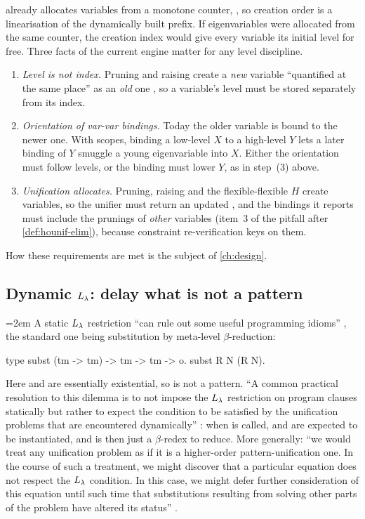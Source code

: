 \begin{kanren}
\micro{} already allocates variables from a monotone counter, , so creation order is a
linearisation of the dynamically built prefix. If eigenvariables were allocated from the same counter, the
creation index would give every variable its initial level for free. Three facts of the current engine matter for
any level discipline.
\begin{enumerate}[nosep]
  \item \emph{Level is not index.} Pruning and raising create a \emph{new} variable \enquote{quantified at the same
    place} as an \emph{old} one , so a variable's level must be stored separately from its index.
  \item \emph{Orientation of var-var bindings.} Today the older variable is bound to the newer one. With scopes,
    binding a low-level $X$ to a high-level $Y$ lets a later binding of $Y$ smuggle a young eigenvariable into $X$.
    Either the orientation must follow levels, or the binding must lower $Y$, as in step~(3) above.
  \item \emph{Unification allocates.} Pruning, raising and the flexible-flexible $H$ create variables, so the
    unifier must return an updated , and the bindings it reports must include the prunings of
    \emph{other} variables (item~3 of the pitfall after \cref{def:hounif-elim}), because constraint re-verification keys on them.
\end{enumerate}
How these requirements are met is the subject of \cref{ch:design}.
\end{kanren}

\subsection{Dynamic \texorpdfstring{$L_\lambda$}{Lλ}: delay what is not a pattern}\label{sec:hounif-dynamic}

{\emergencystretch=2em
A static $L_\lambda$ restriction \enquote{can rule out some useful programming idioms} , the standard one
being substitution by meta-level $\beta$-reduction:\par}
\begin{lprolog}
type   subst   (tm -> tm) -> tm -> tm -> o.
subst R N (R N).
\end{lprolog}
Here  and  are essentially existential, so  is not a pattern. \enquote{A common practical
resolution to this dilemma is to not impose the $L_\lambda$ restriction on program clauses statically but rather to
expect the condition to be satisfied by the unification problems that are encountered dynamically} :
when  is called,  and  are expected to be instantiated, and  is then just a $\beta$-redex
to reduce. More generally: \enquote{we would treat any unification problem as if it is a higher-order
pattern-unification one. In the course of such a treatment, we might discover that a particular equation does not
respect the $L_\lambda$ condition. In this case, we might defer further consideration of this equation until such time
that substitutions resulting from solving other parts of the problem have altered its status} .

